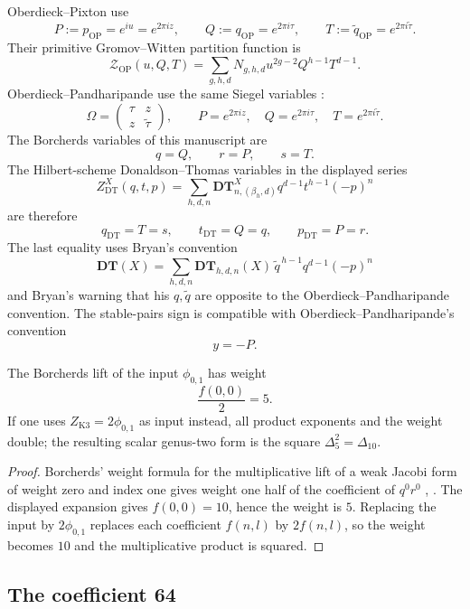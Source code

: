 Oberdieck--Pixton \cite[Theorem 1]{OB} use
$$
P:=p_{\mathrm{OP}}=e^{iu}=e^{2\pi iz},\qquad
Q:=q_{\mathrm{OP}}=e^{2\pi i\tau},\qquad
T:=\widetilde q_{\mathrm{OP}}=e^{2\pi i\widetilde\tau}.
$$
Their primitive Gromov--Witten partition function is
$$
\mathcal Z_{\mathrm{OP}}(u,Q,T)
=\sum_{g,h,d}
N_{g,h,d}u^{2g-2}Q^{h-1}T^{d-1}.
$$
Oberdieck--Pandharipande use the same Siegel variables
\cite[Section 2]{OPand}:
$$
\Omega=\begin{pmatrix}\tau&z\\ z&\widetilde\tau\end{pmatrix},
\qquad
P=e^{2\pi iz},\quad Q=e^{2\pi i\tau},\quad T=e^{2\pi i\widetilde\tau}.
$$
The Borcherds variables of this manuscript are
$$
q=Q,\qquad r=P,\qquad s=T.
$$
The Hilbert-scheme Donaldson--Thomas variables in the displayed series
$$
Z^X_{\mathrm{DT}}(q,t,p)
=\sum_{h,d,n}\mathbf{DT}^X_{n,(\beta_h,d)}
q^{d-1}t^{h-1}(-p)^n
$$
are therefore
$$
q_{\mathrm{DT}}=T=s,\qquad
t_{\mathrm{DT}}=Q=q,\qquad
p_{\mathrm{DT}}=P=r.
$$
The last equality uses Bryan's convention \cite[Definition 2.1]{BRYAN}
$$
\mathbf{DT}(X)=
\sum_{h,d,n}\mathbf{DT}_{h,d,n}(X)\,
\widetilde q^{\,h-1}q^{d-1}(-p)^n
$$
and Bryan's warning that his $q,\widetilde q$ are opposite to the
Oberdieck--Pandharipande convention.  The stable-pairs sign is
compatible with Oberdieck--Pandharipande's convention
\cite[Section 2]{OPand}
$$
y=-P.
$$

\begin{lemma}
The Borcherds lift of the input $\phi_{0,1}$ has weight
$$
\frac{f(0,0)}{2}=5.
$$
If one uses $Z_{\mathrm{K3}}=2\phi_{0,1}$ as input instead, all product
exponents and the weight double; the resulting scalar genus-two form is
the square $\Delta_5^2=\Delta_{10}$.
\end{lemma}

\begin{proof}
Borcherds' weight formula for the multiplicative lift of a weak Jacobi
form of weight zero and index one gives weight one half of the
coefficient of $q^0r^0$ \cite{B}, \cite{GN}.  The displayed expansion gives
$f(0,0)=10$, hence the weight is $5$.  Replacing the input by
$2\phi_{0,1}$ replaces each coefficient $f(n,l)$ by $2f(n,l)$, so the
weight becomes $10$ and the multiplicative product is squared.
\end{proof}

\subsection{The coefficient 64}

